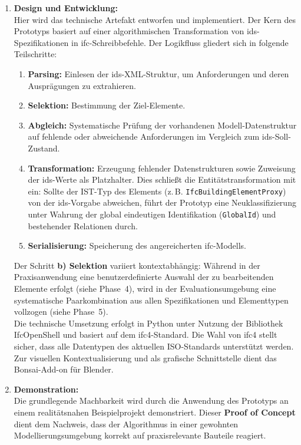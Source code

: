 \begin{enumerate}
    \item \textbf{Design und Entwicklung:} \\
    Hier wird das technische Artefakt entworfen und implementiert. Der Kern des Prototyps 
    basiert auf einer algorithmischen Transformation von \gls{ids}-Spezifikationen in 
    \gls{ifc}-Schreibbefehle. Der Logikfluss gliedert sich in folgende Teilschritte:
    \begin{enumerate}[label=\alph*)]
        \item \textbf{Parsing:} Einlesen der \gls{ids}-XML-Struktur, um Anforderungen und deren Ausprägungen zu extrahieren.
        \item \textbf{Selektion:} Bestimmung der Ziel-Elemente.
        \item \textbf{Abgleich:} Systematische Prüfung der vorhandenen Modell-Datenstruktur auf fehlende oder abweichende Anforderungen im Vergleich zum \gls{ids}-Soll-Zustand.
        \item \textbf{Transformation:} Erzeugung fehlender Datenstrukturen sowie Zuweisung der \gls{ids}-Werte als Platzhalter. Dies schließt die Entitätstransformation mit ein: Sollte der IST-Typ des Elements (z.\,B. \texttt{IfcBuildingElementProxy}) von der \gls{ids}-Vorgabe abweichen, führt der Prototyp eine Neuklassifizierung unter Wahrung der global eindeutigen Identifikation (\texttt{GlobalId}) und bestehender Relationen durch.
        \item \textbf{Serialisierung:} Speicherung des angereicherten \gls{ifc}-Modells.
    \end{enumerate}
    Der Schritt \textbf{b) Selektion} variiert kontextabhängig: Während in der Praxisanwendung eine benutzerdefinierte Auswahl der zu bearbeitenden Elemente erfolgt (siehe Phase~4), wird in der Evaluationsumgebung eine systematische Paarkombination aus allen Spezifikationen und Elementtypen vollzogen (siehe Phase~5). 
    \\
    Die technische Umsetzung erfolgt in Python unter Nutzung der Bibliothek \glqq IfcOpenShell\grqq{} 
    und basiert auf dem \gls{ifc}4-Standard. Die Wahl von \gls{ifc}4 stellt sicher, dass alle Datentypen 
    des aktuellen ISO-Standards unterstützt werden. 
    Zur visuellen Kontextualisierung und als grafische Schnittstelle dient das Bonsai-Add-on für Blender.

    \item \textbf{Demonstration:} \\
    Die grundlegende Machbarkeit wird durch die Anwendung des Prototyps an einem 
    realitätsnahen Beispielprojekt demonstriert. Dieser \textbf{Proof of Concept} dient 
    dem Nachweis, dass der Algorithmus in einer gewohnten Modellierungsumgebung 
    korrekt auf praxisrelevante Bauteile reagiert.


\end{enumerate}
